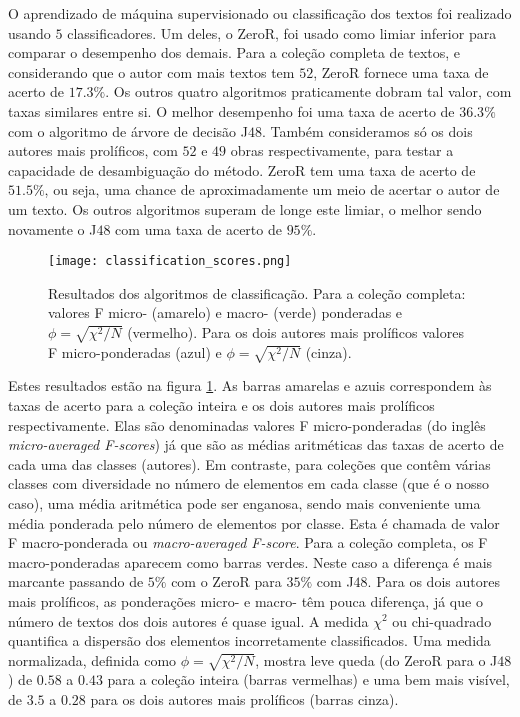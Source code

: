 \documentclass[a4paper,openright,12pt]{report} %
\begin{document}
O aprendizado de m\'aquina supervisionado ou classifica\c c\~ao dos textos foi realizado usando $5$ classificadores. Um deles, o \textrm{ZeroR}, foi usado como limiar inferior para comparar o desempenho dos demais. Para a cole\c c\~ao completa de textos, e considerando que o autor com mais textos tem $52$, \textrm{ZeroR} fornece uma taxa de acerto de $17.3\%$. Os outros quatro algoritmos praticamente dobram tal valor, com taxas similares entre si. O melhor desempenho foi uma taxa de acerto de $36.3\%$ com o algoritmo de \'arvore de decis\~ao J$48$. Tamb\'em consideramos s\'o os dois autores mais prol\'ificos, com $52$ e $49$ obras respectivamente, para testar a capacidade de desambigua\c c\~ao do m\'etodo. \textrm{ZeroR} tem uma taxa de acerto de $51.5\%$, ou seja, uma chance de aproximadamente um meio de acertar o autor de um texto. Os outros algoritmos superam de longe este limiar, o melhor sendo novamente o J$48$ com uma taxa de acerto de $95\%.$\\

\begin{figure}[t]%
\centering
\texttt{[image: classification\_scores.png]}
\caption{Resultados dos algoritmos de classifica\c c\~ao. Para a cole\c c\~ao completa: valores F micro- (amarelo) e macro- (verde) ponderadas e $\phi=\sqrt{\chi^2/N}$ (vermelho). Para os dois autores mais prol\'ificos valores F micro-ponderadas (azul) e $\phi=\sqrt{\chi^2/N}$ (cinza).}
\label{fig:classification_scores}
\end{figure}

Estes resultados est\~ao na figura \ref{fig:classification_scores}. As barras amarelas e azuis correspondem \`as taxas de acerto para a cole\c c\~ao inteira e os dois autores mais prol\'ificos respectivamente. Elas s\~ao denominadas valores F micro-ponderadas (do ingl\^es \textit{micro-averaged F-scores}) j\'a que s\~ao as m\'edias aritm\'eticas das taxas de acerto de cada uma das classes (autores). Em contraste, para cole\c c\~oes que cont\^em v\'arias classes com diversidade no n\'umero de elementos em cada classe (que \'e o nosso caso), uma m\'edia aritm\'etica pode ser enganosa, sendo mais conveniente uma m\'edia ponderada pelo n\'umero de elementos por classe. Esta \'e chamada de valor F macro-ponderada ou \textit{macro-averaged F-score}. Para a cole\c c\~ao completa, os F macro-ponderadas aparecem como barras verdes. Neste caso a diferen\c ca \'e mais marcante passando de $5\%$ com o \textrm{ZeroR} para $35\%$ com J$48$. Para os dois autores mais prol\'ificos, as pondera\c c\~oes micro- e macro- t\^em pouca diferen\c ca, j\'a que o n\'umero de textos dos dois autores \'e quase igual. A medida $\chi^2$ ou chi-quadrado quantifica a dispers\~ao dos elementos incorretamente classificados. Uma medida normalizada, definida como $\phi=\sqrt{\chi^2/N}$, mostra leve queda (do \textrm{ZeroR} para o J$48$) de $0.58$ a $0.43$ para a cole\c c\~ao inteira (barras vermelhas) e uma bem mais vis\'ivel, de $3.5$ a $0.28$ para os dois autores mais prol\'ificos (barras cinza).\\
\end{document}
